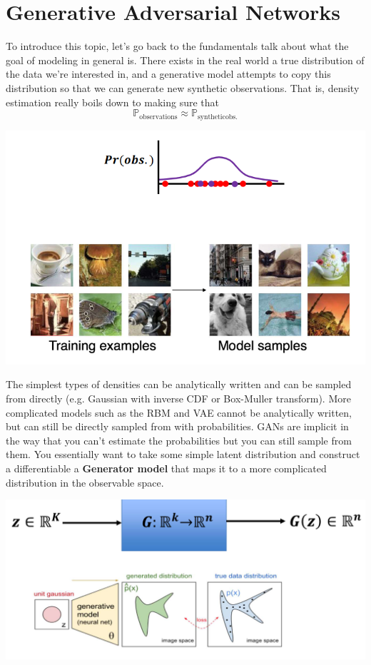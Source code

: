 \section{Generative Adversarial Networks}

  To introduce this topic, let's go back to the fundamentals talk about what the goal of modeling in general is. There exists in the real world a true distribution of the data we're interested in, and a generative model attempts to copy this distribution so that we can generate new synthetic observations. That is, density estimation really boils down to making sure that 
  \[\mathbb{P}_{\mathrm{observations}} \approx \mathbb{P}_{\mathrm{synthetic obs.}}\]
  \begin{center}
    \includegraphics[scale=0.4]{img/09_GAN/training_vs_model_samples.png} 
  \end{center}
  The simplest types of densities can be analytically written and can be sampled from directly (e.g. Gaussian with inverse CDF or Box-Muller transform). More complicated models such as the RBM and VAE cannot be analytically written, but can still be directly sampled from with probabilities. GANs are implicit in the way that you can't estimate the probabilities but you can still sample from them. You essentially want to take some simple latent distribution and construct a differentiable a \textbf{Generator model} that maps it to a more complicated distribution in the observable space. 
  \begin{center}
    \includegraphics[scale=0.4]{img/09_GAN/implicit_gen_models.png}
  \end{center} 

